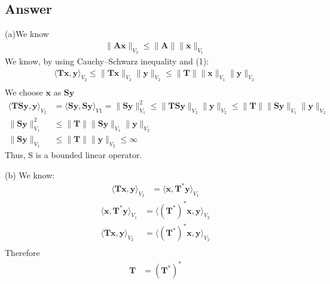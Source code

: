 \documentclass[a4paper,12pt]{article}
\begin{document}
\subsection*{Answer}
(a)We know
\begin{align}
    \|\bm{A}\bm{x}\|_{V_2} \leq \|\bm{A}\|\|\bm{x}\|_{V_1}
\end{align}
We know, by using Cauchy–Schwarz inequality and (1):
\begin{align*}
    \langle \bm{T}\bm{x}, \bm{y}\rangle_{V_2}  \leq \|\bm{T}\bm{x}\|_{V_2}\|\bm{y}\|_{V_2} \leq \|\bm{T}\|\|\bm{x}\|_{V_1}\|\bm{y}\|_{V_2} \\
\end{align*}
We choose \(\bm{x}\) as \(\bm{S}\bm{y}\)
\begin{align*}
    \langle \bm{T}\bm{S}\bm{y}, \bm{y}\rangle_{V_2} &= \langle \bm{S}\bm{y}, \bm{S}\bm{y}\rangle_{V1} = \|\bm{S}\bm{y}\|_{V_1}^2   \leq \|\bm{T}\bm{S}\bm{y}\|_{V_2}\|\bm{y}\|_{V_2} \leq \|\bm{T}\|\|\bm{S}\bm{y}\|_{V_1}\|\bm{y}\|_{V_2} \\
    \|\bm{S}\bm{y}\|_{V_1}^2 &\leq \|\bm{T}\|\|\bm{S}\bm{y}\|_{V_1}\|\bm{y}\|_{V_2}  \\
    \|\bm{S}\bm{y}\|_{V_1} &\leq \|\bm{T}\|\|\bm{y}\|_{V_2}  \leq \infty
\end{align*}
Thus, S is a bounded linear operator.

\vspace{1cm}
\noindent
(b) 
We know:
\begin{align*}
    \langle \bm{T}\bm{x}, \bm{y}\rangle_{V_2} &= \langle \bm{x}, \bm{T}^*\bm{y}\rangle_{V_1} 
\end{align*}
\begin{align*}
    \langle \bm{x}, \bm{T}^*\bm{y}\rangle_{V_1} &= \langle (\bm{T}^*)^*\bm{x}, \bm{y}\rangle_{V_2} \\
    \langle \bm{T}\bm{x}, \bm{y}\rangle_{V_2} &= \langle (\bm{T}^*)^*\bm{x}, \bm{y}\rangle_{V_2} \\
\end{align*}
Therefore 
\begin{align*}
    \bm{T} &= (\bm{T}^*)^*
\end{align*}
\end{document}
